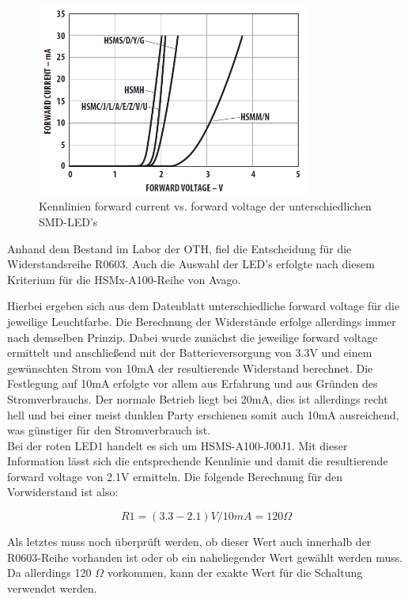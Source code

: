 \documentclass[a4paper,
DIV=13,
12pt,
BCOR=10mm,
department=FakEI,
parskip=half,
automark,
]{article}
\begin{document}
\begin{figure}[!hbpt]
 \begin{center} \includegraphics[width=0.8\textwidth]{Kennlinien_LED_SMD.png}
 \caption{Kennlinien forward current vs. forward voltage der unterschiedlichen SMD-LED's }
 \label{fig:Register}
  \end{center}
\end{figure}
Anhand dem Bestand im Labor der OTH, fiel die Entscheidung für die Widerstandsreihe R0603. Auch die Auswahl der LED's erfolgte nach diesem Kriterium für die HSMx-A100-Reihe von Avago. 

Hierbei ergeben sich aus dem Datenblatt unterschiedliche forward voltage für die jeweilige Leuchtfarbe. Die Berechnung der Widerstände erfolge allerdings immer nach demselben Prinzip. 
Dabei wurde zunächst die jeweilige forward voltage ermittelt und anschließend mit der Batterieversorgung von 3.3V und einem gewünschten Strom von 10mA der resultierende Widerstand berechnet. Die Festlegung auf 10mA erfolgte vor allem aus Erfahrung und aus Gründen des Stromverbrauchs. Der normale Betrieb liegt bei 20mA, dies ist allerdings recht hell und bei einer meist dunklen Party erschienen somit auch 10mA ausreichend, was günstiger für den Stromverbrauch ist.\\

Bei der roten LED1 handelt es sich um HSMS-A100-J00J1. Mit dieser Information lässt sich die entsprechende Kennlinie und damit die resultierende forward voltage von 2.1V ermitteln.
Die folgende Berechnung für den Vorwiderstand ist also:

$$ R1 = (3.3 - 2.1)V / 10mA = 120 \Omega$$

Als letztes muss noch überprüft werden, ob dieser Wert auch innerhalb der R0603-Reihe vorhanden ist oder ob ein naheliegender Wert gewählt werden muss. Da allerdings 120 $\Omega$ vorkommen, kann der exakte Wert für die Schaltung verwendet werden. \\
\end{document}
